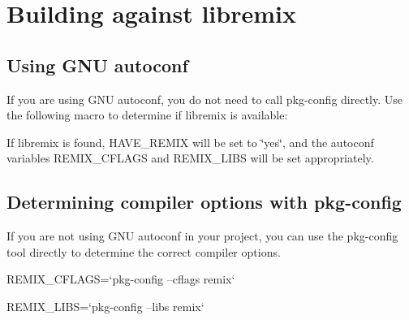 \section{Building against libremix}
\label{group__building}
\subsection{Using GNU autoconf}\label{group__building_autoconf}
If you are using GNU autoconf, you do not need to call pkg-\/config directly. Use the following macro to determine if libremix is available:




If libremix is found, HAVE\_\-REMIX will be set to \char`\"{}yes\char`\"{}, and the autoconf variables REMIX\_\-CFLAGS and REMIX\_\-LIBS will be set appropriately.\subsection{Determining compiler options with pkg-\/config}\label{group__building_pkg-config}
If you are not using GNU autoconf in your project, you can use the pkg-\/config tool directly to determine the correct compiler options.


\begin{DoxyPre}
 REMIX\_CFLAGS=`pkg-config --cflags remix`\end{DoxyPre}



\begin{DoxyPre} REMIX\_LIBS=`pkg-config --libs remix`
 \end{DoxyPre}
 